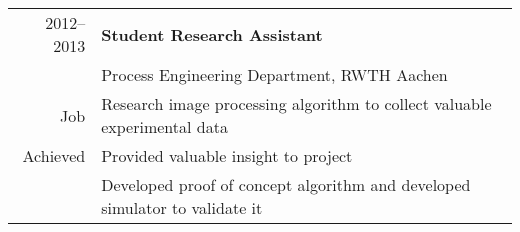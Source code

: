 \begin{tabular}{ r p{} }
2012--2013 & \textbf{Student Research Assistant} \\
           & Process Engineering Department, RWTH Aachen\\
Job        & Research image processing algorithm to collect valuable experimental data\\ 
Achieved   & Provided valuable insight to project\\
           & Developed proof of concept algorithm and developed simulator to validate it\\
\end{tabular}\\

